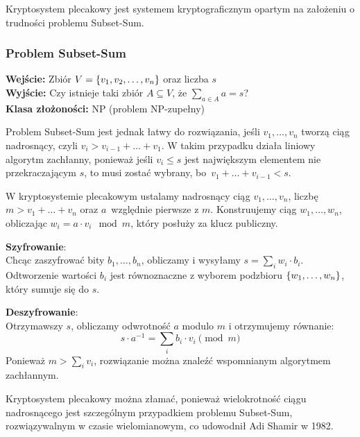 Kryptosystem plecakowy jest systemem kryptograficznym opartym na założeniu o trudności problemu Subset-Sum.

\subsubsection*{Problem Subset-Sum}
\textbf{Wejście:} Zbiór \( V = \set{v_1, v_2, \dots, v_n} \) oraz liczba \( s \) \\
\textbf{Wyjście:} Czy istnieje taki zbiór \( A \subseteq V \), że \( \sum_{a \in A} a = s \)? \\
\textbf{Klasa złożoności:} NP (problem NP-zupełny)

Problem Subset-Sum jest jednak łatwy do rozwiązania, jeśli \( v_1, \dots, v_n \) tworzą ciąg nadrosnący, czyli \( v_i > v_{i-1} + \ldots + v_1 \).
W takim przypadku działa liniowy algorytm zachłanny, ponieważ jeśli \( v_i \leq s \) jest największym elementem nie przekraczającym \( s \), to musi zostać wybrany, bo~\( v_1 + \ldots + v_{i-1} < s \).

W kryptosystemie plecakowym ustalamy nadrosnący ciąg \( v_1, \dots, v_n \), liczbę \( m > v_1 + \ldots + v_n \) oraz \( a \)~względnie pierwsze z \( m \).
Konstruujemy ciąg \( w_1, \dots, w_n \), obliczając \( w_i = a \cdot v_i \mod m \), który posłuży za klucz publiczny.

\textbf{Szyfrowanie}: \\
Chcąc zaszyfrować bity \( b_1, \dots, b_n \), obliczamy i wysyłamy \( s = \sum_i w_i \cdot b_i \). Odtworzenie wartości \( b_i \) jest równoznaczne z wyborem podzbioru \( \set{w_1, \ldots, w_n} \), który sumuje się do \( s \).

\textbf{Deszyfrowanie}: \\
Otrzymawszy \( s \), obliczamy odwrotność \( a \) modulo \( m \) i otrzymujemy równanie:
\[
    s \cdot a^{-1} = \sum_i b_i \cdot v_i \pmod{m}
\]
Ponieważ \( m > \sum_i v_i \), rozwiązanie można znaleźć wspomnianym algorytmem zachłannym.

Kryptosystem plecakowy można złamać, ponieważ wielokrotność ciągu nadrosnącego jest szczególnym przypadkiem problemu Subset-Sum, rozwiązywalnym w czasie wielomianowym, co udowodnił Adi Shamir w 1982.